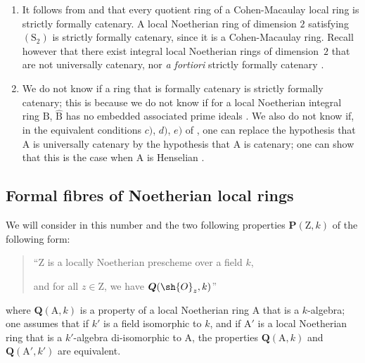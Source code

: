 \begin{remarks}[7.2.10]
\label{IV.7.2.10}
\begin{enumerate}[label=\emph{\roman*)}]
  \item It follows from  and  that every quotient ring of a Cohen-Macaulay local ring is strictly formally catenary.
  A local Noetherian ring of dimension $2$ satisfying $(\mathrm{S}_2)$ is strictly formally catenary, since it is a Cohen-Macaulay ring.
  Recall however that there exist integral local Noetherian rings of dimension~$2$ that are not universally catenary, nor \emph{a fortiori} strictly formally catenary .

  \item We do not know if a ring that is formally catenary  is strictly formally catenary; this is because we do not know if for a local Noetherian integral ring $\mathrm{B}$, $\widehat{\mathrm{B}}$ has no embedded associated prime ideals .
  We also do not know if, in the equivalent conditions $c)$, $d)$, $e)$ of , one can replace the hypothesis that $\mathrm{A}$ is universally catenary by the hypothesis that $\mathrm{A}$ is catenary; one can show that this is the case when $\mathrm{A}$ is Henselian .
\end{enumerate}
\end{remarks}


\subsection{Formal fibres of Noetherian local rings}
\label{subsection:IV.7.3}

\begin{env}[7.3.1]
\label{IV.7.3.1}
We will consider in this number and the two following properties $\boldsymbol{P}(\mathrm{Z},k)$ of the following form:
\begin{quote}
``$\mathrm{Z}$ is a locally Noetherian prescheme over a field $k$,

and for all $z\in\mathrm{Z}$, we have $\boldsymbol{Q}(\sh{O}_z,k)$''
\end{quote}
where $\boldsymbol{Q}(\mathrm{A},k)$ is a property of a local Noetherian ring $\mathrm{A}$ that is a $k$-algebra; one assumes that if $k'$ is a field isomorphic to $k$, and if $\mathrm{A}'$ is a local Noetherian ring that is a $k'$-algebra di-isomorphic to $\mathrm{A}$, the properties $\boldsymbol{Q}(\mathrm{A},k)$ and $\boldsymbol{Q}(\mathrm{A}',k')$ are equivalent.
\end{env}

